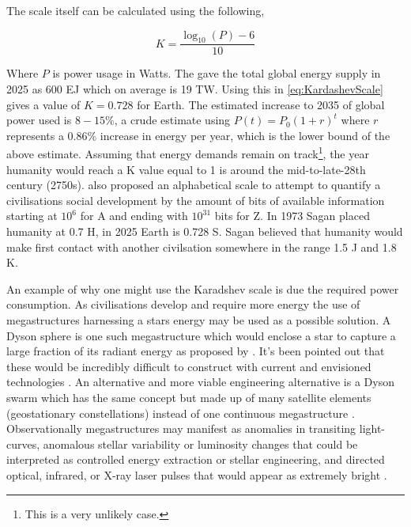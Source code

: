 The scale itself can be calculated using the following, 

\begin{equation}
    K = \frac{\log_{10} (P) -6}{10}
    \label{eq:KardashevScale}
\end{equation}

Where $P$ is power usage in Watts. The \cite{EI2026StatisticalReview} gave the total global energy supply in 2025 as 600 EJ which on average is 19 TW. Using this in \cref{eq:KardashevScale} gives a value of $K = 0.728$ for Earth. The estimated increase to 2035 of global power used is $8-15\%$, a crude estimate using $P(t) = P_0 (1+r)^t$ where $r$ represents a 0.86\% increase in energy per year, which is the lower bound of the above estimate. Assuming that energy demands remain on track\footnote{This is a very unlikely case.}, the year humanity would reach a K value equal to 1 is around the mid-to-late-28th century (2750s). \cite{Sagan1973CosmicConnection} also proposed an alphabetical scale to attempt to quantify a civilisations social development by the amount of bits of available information starting at $10^6$ for A and ending with $10^{31}$ bits for Z.  In 1973 Sagan placed humanity at 0.7 H, in 2025 Earth is 0.728 S. Sagan believed that humanity would make first contact with another civilsation somewhere in the range 1.5 J and 1.8 K.

An example of why one might use the Karadshev scale is due the required power consumption. As civilisations develop and require more energy the use of megastructures harnessing a stars energy may be used as a possible solution. A Dyson sphere is one such megastructure which would enclose a star to capture a large fraction of its radiant energy as proposed by \cite{dyson_search_1960}. It's been pointed out that these would be incredibly difficult to construct with current and envisioned technologies \citep{smith_review_2022,wright_dyson_2020}. An alternative and more viable engineering alternative is a Dyson swarm which has the same concept but made up of many satellite elements (geostationary constellations) instead of one continuous megastructure \citep{smith_review_2022}. Observationally megastructures may manifest as anomalies in transiting light-curves, anomalous stellar variability or luminosity changes that could be interpreted as controlled energy extraction or stellar engineering, and directed optical, infrared, or X-ray laser pulses that would appear as extremely bright \citep{dyson_search_1960, wright_dyson_2020,suazo_project_2024}. 

